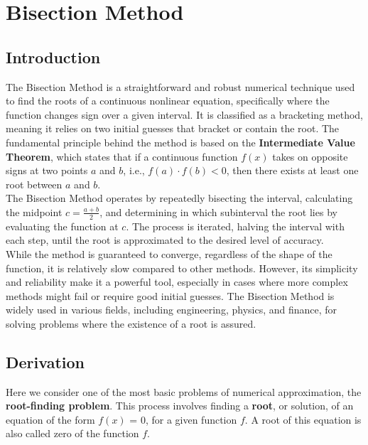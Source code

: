 \documentclass[12pt,a4paper]{article}
\begin{document}
	
	
	\section{\centering  Bisection Method}
	
	\subsection{ Introduction}
	
	\fontsize{18pt}{18pt}\selectfont 
	
	
	
	The Bisection Method is a straightforward and robust numerical technique used to find the roots of a continuous nonlinear equation, specifically where the function changes sign over a given interval. It is classified as a bracketing method, meaning it relies on two initial guesses that bracket or contain the root. The fundamental principle behind the method is based on the \textbf{Intermediate Value Theorem}, which states that if a continuous function \( f(x) \) takes on opposite signs at two points \( a \) and \( b \), i.e., \( f(a) \cdot f(b) < 0 \), then there exists at least one root between \( a \) and \( b \).\\
	
	The Bisection Method operates by repeatedly bisecting the interval, calculating the midpoint \( c = \frac{a+b}{2} \), and determining in which subinterval the root lies by evaluating the function at \( c \). The process is iterated, halving the interval with each step, until the root is approximated to the desired level of accuracy.\\
	
	While the method is guaranteed to converge, regardless of the shape of the function, it is relatively slow compared to other methods. However, its simplicity and reliability make it a powerful tool, especially in cases where more complex methods might fail or require good initial guesses. The Bisection Method is widely used in various fields, including engineering, physics, and finance, for solving problems where the existence of a root is assured.
	
	\subsection{ Derivation} 
	
	Here we consider one of the most basic problems of numerical approximation, the \textbf{root-finding problem}. This process involves finding a \textbf{root}, or solution, of an equation of the form \(f(x)\) = 0, for a given function \(f\). A root of this equation is also called zero of the function \(f\).\\
	
\end{document}
